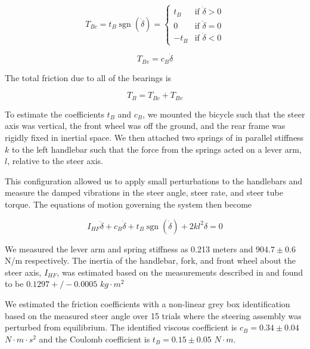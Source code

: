 \documentclass[a4paper]{article}
\begin{document}
\begin{equation}
  T_{Bc} = t_B \operatorname{sgn}(\dot\delta) =
  \begin{cases}
    t_B  & \textrm{if $\dot{\delta}>0$}\\
    0    & \textrm{if $\dot{\delta}=0$}\\
    -t_B & \textrm{if $\dot{\delta}<0$}
  \end{cases}
  \label{eq:coulomb}
\end{equation}

\begin{equation}
  \label{eq:viscous}
  T_{Bv} = c_B \dot{\delta}
\end{equation}

The total friction due to all of the bearings is

\begin{equation}
  T_B = T_{Bc} + T_{Bv}
\end{equation}

To estimate the coefficients $t_B$ and $c_B$, we mounted the bicycle such that
the steer axis was vertical, the front wheel was off the ground, and the rear
frame was rigidly fixed in inertial space. We then attached two springs of in
parallel stiffness $k$ to the left handlebar such that the force from the
springs acted on a lever arm, $l$, relative to the steer axis.

This configuration allowed us to apply small perturbations to the handlebars
and measure the damped vibrations in the steer angle, steer rate, and steer
tube torque. The equations of motion governing the system then become

\begin{equation}
  I_{HF} \ddot{\delta} + c_B \dot{\delta} + t_B
  \operatorname{sgn}(\dot{\delta}) + 2 k l^2 \delta = 0
\end{equation}

We measured the lever arm and spring stiffness as 0.213 meters and $904.7 \pm
0.6$ N/m respectively. The inertia of the handlebar, fork, and front wheel
about the steer axis, $I_{HF}$, was estimated based on the measurements
described in \cite{Moore2012} and found to be $0.1297+/-0.0005$ $kg\cdot m^2$

We estimated the friction coefficients with a non-linear grey box
identification based on the measured steer angle over 15 trials where the
steering assembly was perturbed from equilibrium. The identified viscous
coefficient is $c_B = 0.34 \pm 0.04$ $N \cdot m \cdot s^2$ and the Coulomb
coefficient is $t_B = 0.15 \pm 0.05$ $N \cdot m$.
\end{document}
